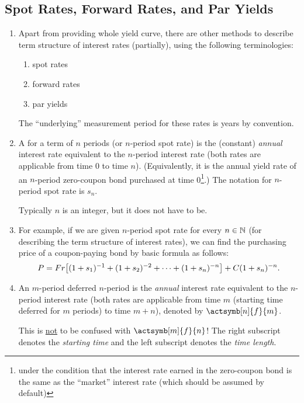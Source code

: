 \subsection{Spot Rates, Forward Rates, and Par Yields}
\label{subsect:spot-fwd-par-yld}
\begin{enumerate}
\item Apart from providing whole yield curve, there are other methods to describe
term structure of interest rates (partially), using the following terminologies:
\begin{enumerate}
\item spot rates
\item forward rates
\item par yields
\end{enumerate}
\begin{note}
The ``underlying'' measurement period for these rates is years by convention.
\end{note}

\item A  for a term of \(n\) periods (or \(n\)-period spot
rate) is the (constant) \emph{annual} interest rate equivalent to the
\(n\)-period interest rate (both rates are applicable from time 0 to time
\(n\)).  (Equivalently, it is the annual yield rate of an \(n\)-period
zero-coupon bond purchased at time 0\footnote{under the condition that the
interest rate earned in the zero-coupon bond is the same as the ``market''
interest rate (which should be assumed by default)}.) The notation for
\(n\)-period spot rate is \(s_n\).

\begin{note}
Typically \(n\) is an integer, but it does not have to be.
\end{note}

\item For example, if we are given \(n\)-period spot rate for every \(n\in\mathbb{N}\)
(for describing the term structure of interest rates), we can find the
purchasing price of a coupon-paying bond by basic formula as follows:
\[
P=Fr\qty[(1+s_1)^{-1}+(1+s_2)^{-2}+\dotsb+(1+s_n)^{-n}]+C(1+s_n)^{-n}.
\]
\item An \(m\)-period deferred \(n\)-period  is the
\emph{annual} interest rate equivalent to the \(n\)-period interest rate (both
rates are applicable from time \(m\) (starting time deferred for \(m\) periods)
to time \(m+n\)), denoted by \(\actsymb[n]{f}{m}\). \begin{warning}
This is \underline{not} to be confused with \(\actsymb[m]{f}{n}\)!
The right subscript denotes the \emph{starting time} and the left subscript
denotes the \emph{time length}.
\end{warning}


\end{enumerate}
